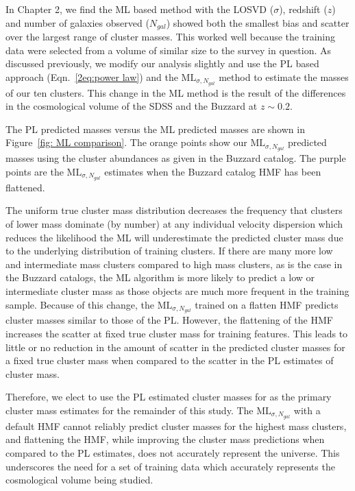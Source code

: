 In Chapter 2, we find the ML based method with the LOSVD ($\sigma$), redshift ($z$) and number of galaxies observed ($N_{gal}$) showed both the smallest bias and scatter over the largest range of cluster masses. This worked well because the training data were selected from a volume of similar size to the survey in question. As discussed previously, we modify our analysis slightly and use the PL based approach (Eqn.~\ref{2eq:power law}) and the $\mathrm{ML}_{\sigma, N_{gal}}$ method to estimate the masses of our ten clusters. This change in the ML method is the result of the differences in the cosmological volume of the SDSS and the Buzzard at $z\sim0.2$.  

The PL predicted masses versus the ML predicted masses are shown in Figure~\ref{fig: ML comparison}. The orange points show our $\mathrm{ML}_{\sigma, N_{gal}}$ predicted masses using the cluster abundances as given in the Buzzard catalog. The purple points are the $\mathrm{ML}_{\sigma, N_{gal}}$ estimates when the Buzzard catalog HMF has been flattened. 

The uniform true cluster mass distribution decreases the frequency that clusters of lower mass dominate (by number) at any individual velocity dispersion which reduces the likelihood the ML will underestimate the predicted cluster mass due to the underlying distribution of training clusters. If there are many more low and intermediate mass clusters compared to high mass clusters, as is the case in the Buzzard catalogs, the ML algorithm is more likely to predict a low or intermediate cluster mass as those objects are much more frequent in the training sample. Because of this change, the $\mathrm{ML}_{\sigma, N_{gal}}$ trained on a flatten HMF predicts cluster masses similar to those of the PL. However, the flattening of the HMF increases the scatter at fixed true cluster mass for training features. This leads to little or no reduction in the amount of scatter in the predicted cluster masses for a fixed true cluster mass when compared to the scatter in the PL estimates of cluster mass.

Therefore, we elect to use the PL estimated cluster masses for as the primary cluster mass estimates for the remainder of this study. The $\mathrm{ML}_{\sigma, N_{gal}}$ with a default HMF cannot reliably predict cluster masses for the highest mass clusters, and flattening the HMF, while improving the cluster mass predictions when compared to the PL estimates, does not accurately represent the universe. This underscores the need for a set of training data which accurately represents the cosmological volume being studied.


